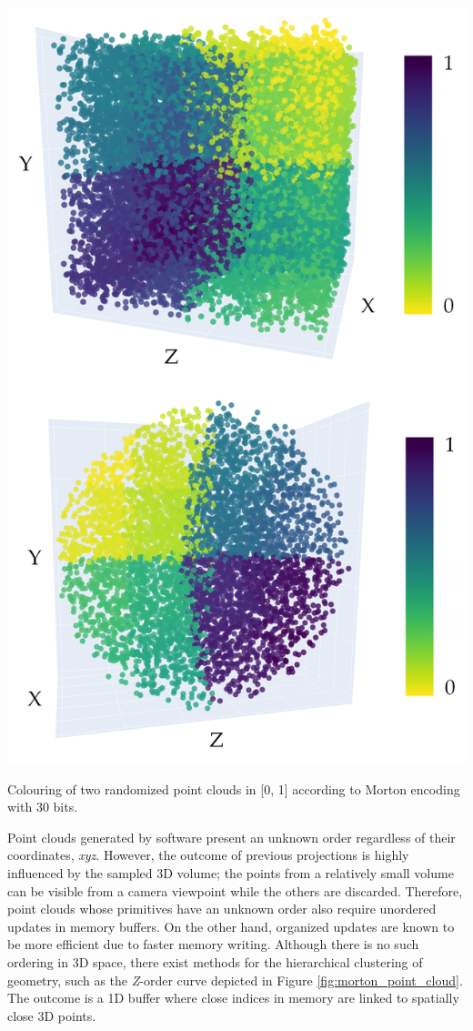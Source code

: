 \begin{marginfigure}[0cm]
    \centering
    \includegraphics[width=\linewidth]{figs/multi_thermal_projection/point_cloud_morton.png}
    \caption{Colouring of two randomized point clouds in [0, 1] according to Morton encoding with 30 bits. }
	\label{fig:morton_point_cloud}
\end{marginfigure}
Point clouds generated by software present an unknown order regardless of their coordinates, \textit{xyz}. However, the outcome of previous projections is highly influenced by the sampled 3D volume; the points from a relatively small volume can be visible from a camera viewpoint while the others are discarded. Therefore, point clouds whose primitives have an unknown order also require unordered updates in memory buffers. On the other hand, organized updates are known to be more efficient due to faster memory writing. Although there is no such ordering in 3D space, there exist methods for the hierarchical clustering of geometry, such as the \textit{Z}-order curve depicted in Figure \ref{fig:morton_point_cloud}. The outcome is a 1D buffer where close indices in memory are linked to spatially close 3D points. 

